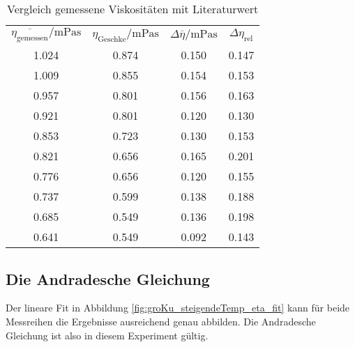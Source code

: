 \begin{table}
    \centering
    \caption{Vergleich gemessene Viskositäten mit Literaturwert \cite[][290]{geschke}}
    \label{tab:viskositaeten_vergleich}
    \begin{tabular}[]{S S S S}
        \toprule
        {$\overline{\eta_\text{gemessen}} / \unit{\milli\pascal\s}$}%
        &{$\eta_\text{Geschke}/\unit{\milli\pascal\s}$ \cite[][]{geschke}} %
        &{$\Delta \overline{\eta}/ \unit{\milli\pascal\s}$}%
        &{$\Delta \eta_\text{rel}$}\\
        1.024  & 0.874 & 0.150 &  0.147\\
        1.009  & 0.855 & 0.154 &  0.153\\
        0.957  & 0.801 & 0.156 &  0.163\\
        0.921  & 0.801 & 0.120 &  0.130\\
        0.853  & 0.723 & 0.130 &  0.153\\
        0.821  & 0.656 & 0.165 &  0.201\\
        0.776  & 0.656 & 0.120 &  0.155\\
        0.737  & 0.599 & 0.138 &  0.188\\
        0.685  & 0.549 & 0.136 &  0.198\\
        0.641  & 0.549 & 0.092 &  0.143\\
    \end{tabular}
\end{table}


\subsection[]{Die Andradesche Gleichung}
Der lineare Fit in Abbildung \ref{fig:groKu_steigendeTemp_eta_fit} kann für beide Messreihen die
Ergebnisse ausreichend genau abbilden. 
Die Andradesche Gleichung ist also in diesem Experiment gültig.

